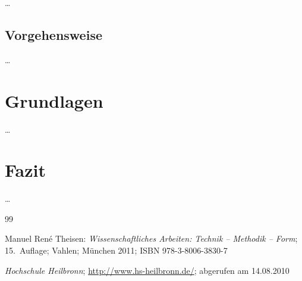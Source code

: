 \documentclass[12pt,toc=bib,toc=listof]{scrreprt}
\begin{document}
\ldots


\section{Vorgehensweise} %
\label{sec:vorgehensweise}

\ldots


\chapter{Grundlagen} %
\label{sec:grundlagen}

\ldots



\chapter{Fazit} %
\label{sec:fazit}

\ldots


\appendix
\begin{thebibliography}{99}
\raggedright
 Manuel René Theisen:
 \emph{Wissenschaftliches Arbeiten: Technik -- Methodik -- Form};
 15.~Auflage; Vahlen; München 2011;
 ISBN 978-3-8006-3830-7

 \emph{Hochschule Heilbronn};
 \url{http://www.hs-heilbronn.de/};
 abgerufen am 14.08.2010
\end{thebibliography}
\end{document}
